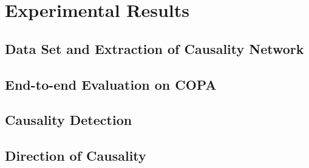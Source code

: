 \section{Experimental Results}
\label{sec:eval}

\subsection{Data Set and Extraction of Causality Network}
\label{sec:causalnet}

\subsection{End-to-end Evaluation on COPA}

\subsection{Causality Detection}

\subsection{Direction of Causality}

